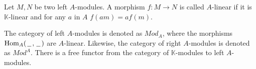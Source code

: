 \documentclass[../thesis.tex]{subfiles}
\begin{document}
\begin{definition}[Modules]



    

    
    

            \end{definition}

            \begin{definition}
                Let $M,N$ be two left $A$-modules. A morphism $f:M\rightarrow N$ is called $A$-linear if it is $\mathbb{K}$-linear and for any $a$ in $A$ $f(am) = af(m)$.
            \end{definition}

            The category of left $A$-modules is denoted as $Mod_A$, where the morphisms $\text{Hom}_A(\hspace{0.05cm}\underline{\hspace{0.2cm}}\hspace{0.05cm},\hspace{0.05cm}\underline{\hspace{0.2cm}}\hspace{0.05cm})$ are $A$-linear. Likewise, the category of right $A$-modules is denoted as $Mod^A$. There is a free functor from the category of $\mathbb{K}$-modules to left $A$-modules.
\end{document}
